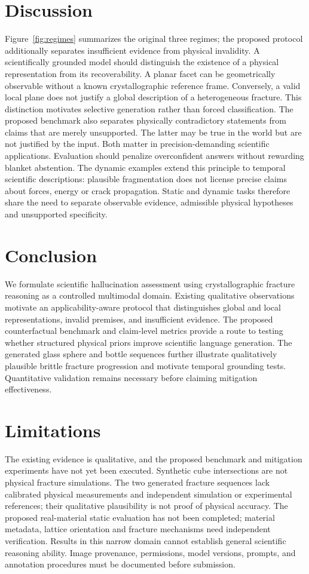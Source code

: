 \documentclass[11pt]{article}
\begin{document}
\section{Discussion}
Figure~\ref{fig:regimes} summarizes the original three regimes; the proposed protocol additionally separates insufficient evidence from physical invalidity.
A scientifically grounded model should distinguish the existence of a physical representation from its recoverability. A planar facet can be geometrically observable without a known crystallographic reference frame. Conversely, a valid local plane does not justify a global description of a heterogeneous fracture. This distinction motivates selective generation rather than forced classification.
The proposed benchmark also separates physically contradictory statements from claims that are merely unsupported. The latter may be true in the world but are not justified by the input. Both matter in precision-demanding scientific applications. Evaluation should penalize overconfident answers without rewarding blanket abstention. The dynamic examples extend this principle to temporal scientific descriptions: plausible fragmentation does not license precise claims about forces, energy or crack propagation. Static and dynamic tasks therefore share the need to separate observable evidence, admissible physical hypotheses and unsupported specificity.
\section{Conclusion}
We formulate scientific hallucination assessment using crystallographic fracture reasoning as a controlled multimodal domain. Existing qualitative observations motivate an applicability-aware protocol that distinguishes global and local representations, invalid premises, and insufficient evidence. The proposed counterfactual benchmark and claim-level metrics provide a route to testing whether structured physical priors improve scientific language generation. The generated glass sphere and bottle sequences further illustrate qualitatively plausible brittle fracture progression and motivate temporal grounding tests. Quantitative validation remains necessary before claiming mitigation effectiveness.
\section*{Limitations}
The existing evidence is qualitative, and the proposed benchmark and mitigation experiments have not yet been executed. Synthetic cube intersections are not physical fracture simulations. The two generated fracture sequences lack calibrated physical measurements and independent simulation or experimental references; their qualitative plausibility is not proof of physical accuracy. The proposed real-material static evaluation has not been completed; material metadata, lattice orientation and fracture mechanisms need independent verification. Results in this narrow domain cannot establish general scientific reasoning ability. Image provenance, permissions, model versions, prompts, and annotation procedures must be documented before submission.
\end{document}
